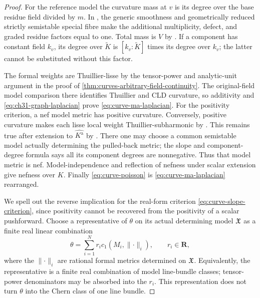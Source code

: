 \begin{proof}
For the reference model the curvature mass at \(v\) is its degree
over the base residue field divided by \(m\).
In \cite[Theorem~18.5.5 and Proposition~18.5.6(a)--(c)]{CLD25},
the generic smoothness and geometrically reduced strictly semistable
special fibre make the additional multiplicity, defect, and graded
residue factors equal to one.  Total mass is \(V\) by
\cite[Theorem~18.3.11]{CLD25}.
If a component has constant field \(k_v\), its degree over
\(\widetilde K\) is \([k_v:\widetilde K]\) times its degree over
\(k_v\); the latter cannot be substituted without this factor.

The formal weights are Thuillier-lisse by the tensor-power and
analytic-unit argument in the proof of
\cref{thm:curves-arbitrary-field-continuity}.
The original-field model comparison there identifies Thuillier and
CLD curvature, so additivity and \eqref{eq:ch31-graph-laplacian}
prove \eqref{eq:curve-ma-laplacian}.
For the positivity criterion, a nef model metric has positive
curvature.  Conversely, positive curvature makes each lisse local
weight Thuillier-subharmonic by \cite[Theorem~3.4.12(ii)]{Thu05}.
This remains true after extension to \(\widehat{K^{\mathrm a}}\)
by \cite[Corollary~3.4.5]{Thu05}.  There one may choose a common
semistable model actually determining the pulled-back metric; the
slope and component-degree formula
\cite[Proposition~3.7]{GJKM19} says all its component degrees are
nonnegative.  Thus that model metric is nef.
Model-independence and reflection of nefness under scalar extension
\cite[Proposition~3.5 and Lemma~3.3]{GM19} give nefness over \(K\).
Finally \eqref{eq:curve-poisson} is
\eqref{eq:curve-ma-laplacian} rearranged.

We spell out the reverse implication for the real-form criterion
\eqref{eq:curve-slope-criterion}, since positivity cannot be recovered
from the positivity of a scalar pushforward.
Choose a representative of \(\theta\) on its actual determining
model \(\mathfrak X\) as a finite real linear combination
\[
       \theta=\sum_{i=1}^N r_i
                   c_1(M_i,\lVert\cdot\rVert_i),
       \qquad r_i\in\mathbf R,
\]
where the \(\lVert\cdot\rVert_i\) are rational formal metrics
determined on \(\mathfrak X\).  Equivalently, the representative is a finite
real combination of model line-bundle classes; tensor-power
denominators may be absorbed into the \(r_i\).
This representation does not turn \(\theta\) into the Chern class
of one line bundle.


\end{proof}
